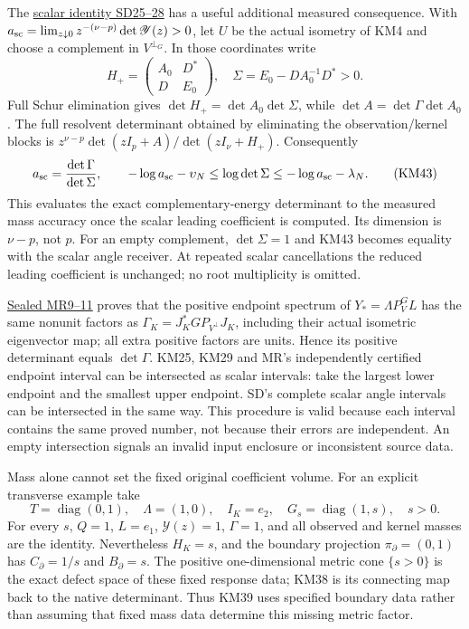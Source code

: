 \documentclass[11pt]{article}
\begin{document}
The \href{https://github.com/KokunoYumeto/zeta-function-research-reader/blob/e40b46fde72c245dd79ef5691f59c21d6cbf0c75/workbenches/splitzero-tandem/continuations/20260922-original-observation-recovery/SCALAR_RECOVERY_PROOFS.md\#L249}{scalar identity SD25--28} has a useful additional measured consequence. With \(a_{\rm sc}=\lim_{z\downarrow0}z^{-(\nu-p)}\det\mathscr Y(z)>0\), let \(U\) be the actual isometry of KM4 and choose a complement in \(V^{\perp_G}\). In those coordinates write \[
 H_+=\begin{pmatrix}A_0&D^*\\D&E_0\end{pmatrix},\quad
 \Sigma=E_0-DA_0^{-1}D^*>0.
\] Full Schur elimination gives \(\det H_+=\det A_0\det\Sigma\), while \(\det A=\det\Gamma\det A_0\). The full resolvent determinant obtained by eliminating the observation/kernel blocks is \(z^{\nu-p}\det(zI_p+A)/\det(zI_\nu+H_+)\). Consequently \[
 a_{\rm sc}=\frac{\det\Gamma}{\det\Sigma},\qquad
 -\log a_{\rm sc}-\upsilon_N
 \le\log\det\Sigma\le
 -\log a_{\rm sc}-\lambda_N .
 \tag{KM43}
\] This evaluates the exact complementary-energy determinant to the measured mass accuracy once the scalar leading coefficient is computed. Its dimension is \(\nu-p\), not \(p\). For an empty complement, \(\det\Sigma=1\) and KM43 becomes equality with the scalar angle receiver. At repeated scalar cancellations the reduced leading coefficient is unchanged; no root multiplicity is omitted.

\href{https://github.com/KokunoYumeto/zeta-function-research-reader/blob/e40b46fde72c245dd79ef5691f59c21d6cbf0c75/workbenches/splitzero-tandem/continuations/20260922-original-observation-recovery/MATRIX_RECOVERY_PROOFS.md\#L144}{Sealed MR9--11} proves that the positive endpoint spectrum of \(Y_*=\Lambda P_V^GL\) has the same nonunit factors as \(\Gamma_K=J_K^*GP_{V^\perp}J_K\), including their actual isometric eigenvector map; all extra positive factors are units. Hence its positive determinant equals \(\det\Gamma\). KM25, KM29 and MR's independently certified endpoint interval can be intersected as scalar intervals: take the largest lower endpoint and the smallest upper endpoint. SD's complete scalar angle intervals can be intersected in the same way. This procedure is valid because each interval contains the same proved number, not because their errors are independent. An empty intersection signals an invalid input enclosure or inconsistent source data.

Mass alone cannot set the fixed original coefficient volume. For an explicit transverse example take \[
 T=\operatorname{diag}(0,1),\quad\Lambda=(1,0),\quad I_K=e_2,
 \quad G_s=\operatorname{diag}(1,s),\quad s>0.
 \tag{KM44}
\] For every \(s\), \(Q=1\), \(L=e_1\), \(\mathscr Y(z)=1\), \(\Gamma=1\), and all observed and kernel masses are the identity. Nevertheless \(H_K=s\), and the boundary projection \(\pi_\partial=(0,1)\) has \(C_\partial=1/s\) and \(B_\partial=s\). The positive one-dimensional metric cone \(\{s>0\}\) is the exact defect space of these fixed response data; KM38 is its connecting map back to the native determinant. Thus KM39 uses specified boundary data rather than assuming that fixed mass data determine this missing metric factor.
\end{document}
